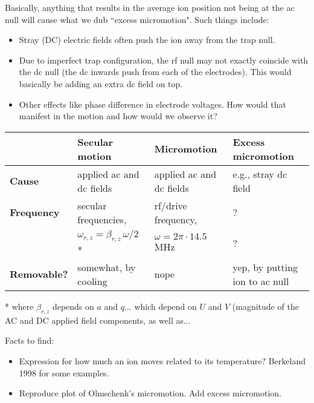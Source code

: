 \documentclass{article}
\begin{document}
Basically, anything that results in the average ion position not being at the ac null will cause what we dub ``excess micromotion". Such things include:

\begin{itemize}
\item Stray (DC) electric fields often push the ion away from the trap null. 
\item Due to imperfect trap configuration, the rf null may not exactly coincide with the dc null (the dc inwards push from each of the electrodes). This would basically be adding an extra dc field on top.
\item Other effects like phase difference in electrode voltages. How would that manifest in the motion and how would we observe it?  
\end{itemize}

\vspace{0mm}
\begin{center}
\begin{tabular}{l l l l} \toprule
& \textbf{Secular motion} & \textbf{Micromotion} & \textbf{Excess micromotion} \\ \midrule
\textbf{Cause} & applied ac and dc fields & applied ac and dc fields & e.g., stray dc field \\
\textbf{Frequency} & secular frequencies, & rf/drive frequency, & ? \\
 & $\omega_{r, z} = \beta_{r,z} \, \omega /2$ *&  $\omega = 2 \pi \cdot 14.5$ MHz & ? \\
\textbf{Removable?} & somewhat, by cooling & nope & yep, by putting ion to ac null \\
\bottomrule
\end{tabular}
\end{center}

\vspace{2mm}

* where $\beta_{r,z}$ depends on $a$ and $q$... which depend on $U$ and $V$ (magnitude of the AC and DC applied field components, as well as...


\vspace{5mm} \noindent Facts to find:

\begin{itemize}
\item Expression for how much an ion moves related to its temperature? Berkeland 1998 for some examples.
\item Reproduce plot of Olmschenk's micromotion. Add excess micromotion.
\end{itemize}
\end{document}
